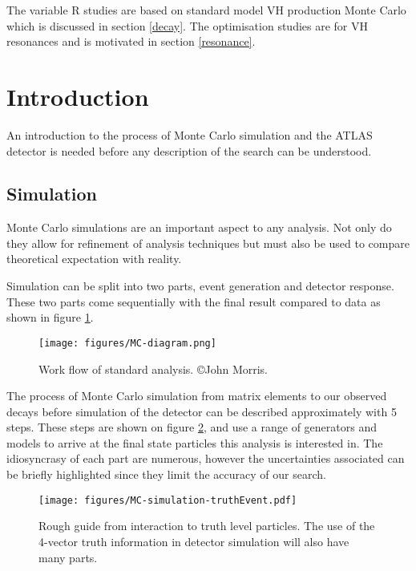 The variable R studies are based on standard model VH production Monte Carlo which is discussed in section \ref{decay}. The optimisation studies are for VH resonances and is motivated in section \ref{resonance}. 
\section{Introduction}
An introduction to the process of Monte Carlo simulation and the ATLAS detector is needed before any description of the search can be understood.
\subsection{Simulation}
\label{section:Simulation}
Monte Carlo simulations are an important aspect to any analysis. Not only do they allow for refinement of analysis techniques but must also be used to compare theoretical expectation with reality.   

Simulation can be split into two parts, event generation and detector response. These two parts come sequentially with the final result compared to data as shown in figure \ref{fig:decays}. 

\begin{figure}[H]
\centering
\texttt{[image: figures/MC-diagram.png]}
\caption{Work flow of standard analysis. \copyright John Morris.}
\label{fig:decays}
\end{figure}

The process of Monte Carlo simulation from matrix elements to our observed decays before simulation of the detector can be described approximately with 5 steps\cite{Jmorris}. These steps are shown on figure \ref{fig:guide}, and use a range of generators and models to arrive at the final state particles this analysis is interested in. The idiosyncrasy of each part are numerous, however the uncertainties associated can be briefly highlighted since they limit the accuracy of our search.
\begin{figure}[H]
\hspace{-1cm}
\texttt{[image: figures/MC-simulation-truthEvent.pdf]}
\caption{Rough guide from interaction to truth level particles. The use of the 4-vector truth information in detector simulation will also have many parts.}
\label{fig:guide}
\end{figure}

